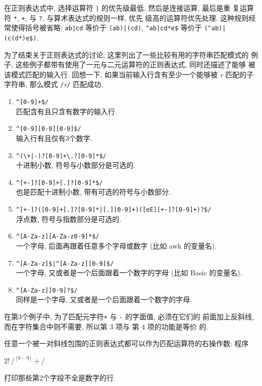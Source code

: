 在正则表达式中, 选择运算符 \verb'|' 的优先级最低, 然后是连接运算, 最后是重
复运算符 \verb'*', \verb'+', 与 \verb'?'. 与算术表达式的规则一样, 优先
级高的运算符优先处理. 这种规则经常使得括号被省略: \verb'ab|cd' 等价于
\verb'(ab)|(cd)', \verb'^ab|cd*e$' 等价于 \verb'(^ab)|(c(d*)e$)'.

为了结束关于正则表达式的讨论, 这里列出了一些比较有用的字符串匹配模式的
例子, 这些例子都带有使用了一元与二元运算符的正则表达式, 同时还描述了能够
被该模式匹配的输入行. 回想一下, 如果当前输入行含有至少一个能够被
\textit{r} 匹配的子字符串, 那么模式 \verb'/'\textit{r}\verb'/'
匹配成功.
\begin{enumerate}
\item \verb'^[0-9]+$/' \\
    匹配含有且只含有数字的输入行.
\item \verb'^[0-9][0-9][0-9]$/' \\
    输入行有且仅有3个数字.
\item \verb'^(\+|-)?[0-9]+\.?[0-9]*$/' \\
    十进制小数, 符号与小数部分是可选的.
\item \verb'^[+-]?[0-9]+[.]?[0-9]*$/' \\
    也是匹配十进制小数, 带有可选的符号与小数部分.
\item \verb'^[+-]?([0-9]+[.]?[0-9]*|[.][0-9]+)([eE][+-]?[0-9]+)?$/' \\
    浮点数, 符号与指数部分是可选的.
\item \verb'^[A-Za-z][A-Za-z0-9]*$/' \\
    一个字母, 后面再跟着任意多个字母或数字 (比如 awk 的变量名).
\item \verb'^[A-Za-z]$|^[A-Za-z][0-9]$/' \\
    一个字母, 又或者是一个后面跟着一个数字的字母 (比如 Basic 的变量名).
\item \verb'^[A-Za-z][0-9]?$/' \\
    同样是一个字母, 又或者是一个后面跟着一个数字的字母.
\end{enumerate}
在第3个例子中, 为了匹配元字符\verb'+' 与 \verb'-' 的字面值, 必须在它们的
前面加上反斜线, 而在字符集合中则不需要, 所以第 3 项与 第 4 项的功能是等价
的.

任意一个被一对斜线包围的正则表达式都可以作为匹配运算符的右操作数: 程序
\begin{awkcode}
    $2 !~ /^[0-9]+$/
\end{awkcode}
打印那些第2个字段不全是数字的行.

